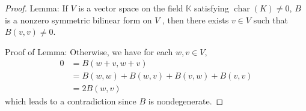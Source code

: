 \documentclass[../main.tex]{subfiles}
\begin{document}
\begin{proof}

     
     
     Lemma: If \(  V  \) is a vector space on the field \(  \mathbb{K}  \)  satisfying \(  \operatorname{char}\left( K \right)\neq 0   \), \(  B  \) is a nonzero symmetric bilinear form on \(  V  \) , then there exists \(  v \in V  \) such that \(  B\left( v,v \right)\neq 0   \).       

     Proof of Lemma:  Otherwise, we have for each \(  w,v\in V  \), \[
    \begin{aligned}
    0&= B\left( w+ v,w+ v \right)\\ 
     &= B\left( w,w \right)+ B\left( w,v \right)+ B\left( v,w \right)+ B\left( v,v \right)\\ 
      &= 2B\left( w,v \right)     
    \end{aligned}
    \]  which leads to a contradiction since \(  B  \) is nondegenerate. 



\end{proof}
\end{document}
